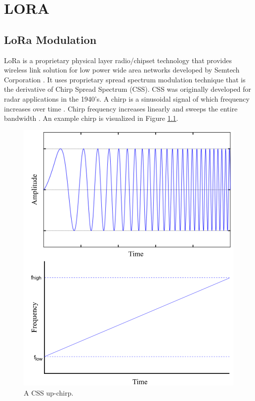 \chapter{LORA}\label{ch:lora_lorawan}

\section{LoRa Modulation}

LoRa is a proprietary physical layer radio/chipset technology that provides wireless link solution for low power wide area networks developed by Semtech Corporation \cite{semtech}. It uses proprietary spread spectrum modulation technique that is the derivative of Chirp Spread Spectrum (CSS). CSS was originally developed for radar applications in the 1940’s. A chirp is a sinusoidal signal of which frequency increases over time \cite{1091721}. Chirp frequency increases linearly and sweeps the entire bandwidth \cite{AN1200.22}. An example chirp is visualized in Figure \ref{fig:lora_chirp}.

\begin{figure}[h]
\centering
\includegraphics[width=.7\linewidth]{fig/lora_chirp.png}
\vspace*{5mm}
\caption{A CSS up-chirp. \cite{sghoslya_lora}}
\label{fig:lora_chirp}
\end{figure}

